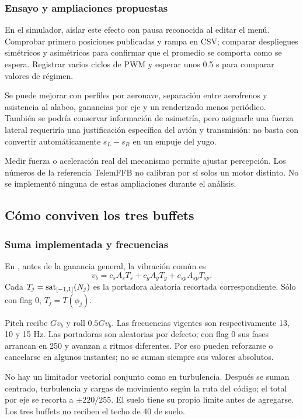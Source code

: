 \subsubsection{Ensayo y ampliaciones propuestas}
En el simulador, aislar este efecto con pausa reconocida al editar el menú. Comprobar primero posiciones publicadas y rampa en CSV; comparar despliegues simétricos y asimétricos para confirmar que el promedio se comporta como se espera. Registrar varios ciclos de PWM y esperar unos 0.5 s para comparar valores de régimen.

Se puede mejorar con perfiles por aeronave, separación entre aerofrenos y asistencia al alabeo, ganancias por eje y un renderizado menos periódico. También se podría conservar información de asimetría, pero asignarle una fuerza lateral requeriría una justificación específica del avión y transmisión: no basta con convertir automáticamente $s_L-s_R$ en un empuje del yugo.

Medir fuerza o aceleración real del mecanismo permite ajustar percepción. Los números de la referencia TelemFFB no calibran por sí solos un motor distinto. No se implementó ninguna de estas ampliaciones durante el análisis.

\subsection{Cómo conviven los tres buffets}
\subsubsection{Suma implementada y frecuencias}
En , antes de la ganancia general, la vibración común es
\begin{equation}
v_b=c_sA_sT_s+c_gA_gT_g+c_{sp}A_{sp}T_{sp}.
\end{equation}
Cada $T_j=\operatorname{sat}_{[-1,1]}(N_j)$ es la portadora aleatoria recortada correspondiente. Sólo con flag 0, $T_j=T(\phi_j)$.

Pitch recibe $Gv_b$ y roll $0.5Gv_b$. Las frecuencias vigentes son respectivamente 13, 10 y 15 Hz. Las portadoras son aleatorias por defecto; con flag 0 sus fases arrancan en 250 y avanzan a ritmos diferentes. Por eso pueden reforzarse o cancelarse en algunos instantes; no se suman siempre sus valores absolutos.

No hay un limitador vectorial conjunto como en turbulencia. Después se suman centrado, turbulencia y cargas de movimiento según la ruta del código; el total por eje se recorta a $\pm220/255$. El suelo tiene su propio límite antes de agregarse. Los tres buffets no reciben el techo de 40 de suelo.

